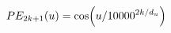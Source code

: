\documentclass[preview]{standalone}
\begin{document}
\begin{align*}
\special{dvisvgm:raw <g id='unique000'>}PE_{2k+1}(u)=\cos\!\left(u/10000^{2k/d_u}\right)\special{dvisvgm:raw </g>}
\end{align*}
\end{document}
